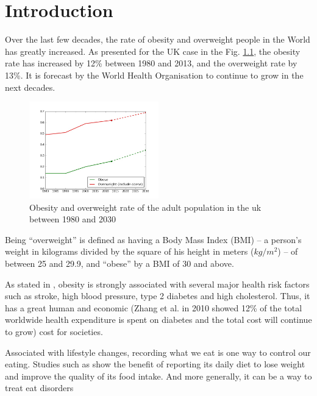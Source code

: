 \chapter{Introduction}

Over the last few decades, the rate of obesity and overweight people in the World has greatly increased. As presented for the UK case in the Fig. \ref{fig:obesity_uk}, the obesity rate has increased by 12\% between 1980 and 2013, and the overweight rate by 13\%. It is forecast by the World Health Organisation to continue to grow in the next decades.

\begin{figure}[h]
    \centering
    \includegraphics[width=0.5\textwidth,  height=0.455\textwidth ]{img/obesity_uk.jpg}
    \caption[Obesity and overweight rate of the adult population in the uk between 1980 and 2030. \textit{Source: World Health Organisation}]{Obesity and overweight rate of the adult population in the uk between 1980 and 2030}
    \label{fig:obesity_uk}
\end{figure}

Being \enquote{overweight} is defined as having a Body Mass Index (BMI) – a person's weight in kilograms divided by the square of his height in meters ($ kg / m^2 $) – of between 25 and 29.9, and \enquote{obese} by a BMI of 30 and above.

As stated in \cite{Mokdad2003}, obesity is strongly associated with several major health risk factors such as stroke, high blood pressure, type 2 diabetes and high cholesterol. Thus, it has a great human and economic (Zhang et al. \cite{Zhang2010} in 2010 showed 12\% of the total worldwide health expenditure is spent on diabetes and the total cost will continue to grow) cost for societies.

Associated with lifestyle changes, recording what we eat is one way to control our eating. Studies such as \cite{Burke2011a} show the benefit of reporting its daily diet to lose weight and improve the quality of its food intake. And more generally, it can be a way to treat eat disorders

